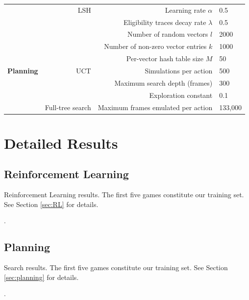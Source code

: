 \documentclass[twoside,11pt]{article}
\begin{document}
\begin{table}[h!]
\begin{center}
\begin{tabular}{|r||r||r|l|}
& LSH & Learning rate $\alpha$ & 0.5 \\
\cline{3-4}
& & Eligibility traces decay rate $\lambda$ & 0.5 \\
\cline{3-4}
& & Number of random vectors $l$ & 2000 \\
\cline{3-4}
& & Number of non-zero vector entries $k$ & 1000 \\
\cline{3-4}
& & Per-vector hash table size $M$ & 50 \\ 
\hline
\hline
\textbf{Planning} & UCT & Simulations per action & 500 \\
\cline{3-4}
& & Maximum search depth (frames) & 300 \\
\cline{3-4}
& & Exploration constant & 0.1 \\
\cline{2-4}
& Full-tree search & Maximum frames emulated per action & 133,000 \\
\hline
\end{tabular}
\end{center}
\end{table}

\newpage
\section{Detailed Results}\label{appendix:detailed_results}

\subsection{Reinforcement Learning}

\begin{table}[h!]
\tiny
\begin{center}

\caption{Reinforcement Learning results. The first five games constitute our training set. See Section \ref{sec:RL} for details.\label{table:appendix:detailed_results:rl}}.
\end{center}
\end{table}

\newpage
\subsection{Planning}
\begin{table}[h!]
\tiny
\begin{center}

\caption{Search results. The first five games constitute our training set. See Section \ref{sec:planning} for details.\label{table:appendix:detailed_results:search}}.
\end{center}
\end{table}

\newpage

\nocite{Russell97rationalityand,Hutter:04uaibook,legg08machine}


\end{document}
